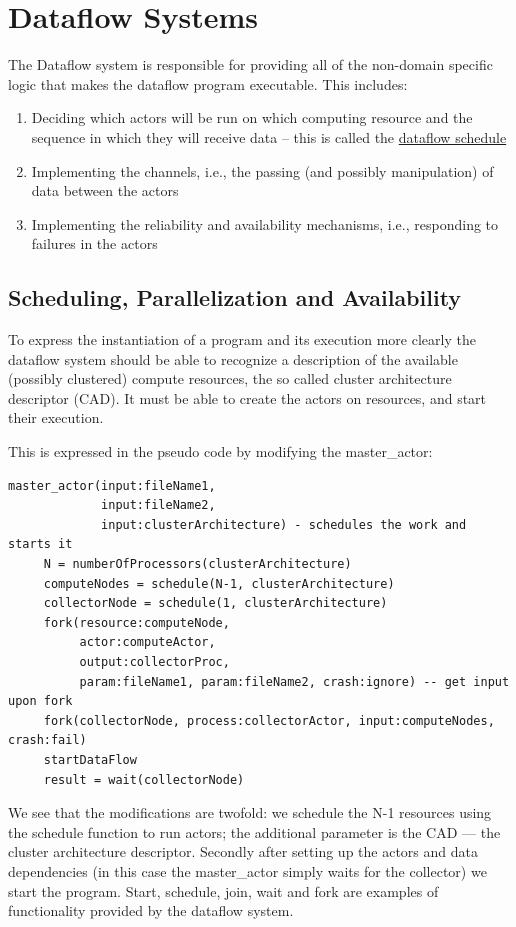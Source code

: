 \documentclass[11pt,a4paper]{article}
\begin{document}
\section{Dataflow Systems}
\label{sec:dataflow-systems}
The Dataflow system is responsible for providing all of the non-domain
specific logic that makes the dataflow program executable. This
includes:
\begin{enumerate}
\item Deciding which actors will be run on which computing resource
  and the sequence in which they will receive data -- this is called
  the \underline{dataflow schedule}
\item Implementing the channels, i.e., the passing (and possibly
  manipulation) of data between the actors
\item Implementing the reliability and availability mechanisms, i.e.,
  responding to failures in the actors 
\end{enumerate}

\subsection{Scheduling, Parallelization and Availability}

To express the instantiation of a program and its execution more
clearly the dataflow system should be able to recognize a description
of the available (possibly clustered) compute resources, the so called
cluster architecture descriptor (CAD).  It must be able to create the
actors on resources, and start their execution.  


\begin{Example}

This is expressed in
the pseudo code by modifying the master\_actor:

\begin{lstlisting}
master_actor(input:fileName1, 
             input:fileName2, 
             input:clusterArchitecture) - schedules the work and starts it
     N = numberOfProcessors(clusterArchitecture)
     computeNodes = schedule(N-1, clusterArchitecture)
     collectorNode = schedule(1, clusterArchitecture)
     fork(resource:computeNode, 
          actor:computeActor, 
          output:collectorProc,
          param:fileName1, param:fileName2, crash:ignore) -- get input upon fork
     fork(collectorNode, process:collectorActor, input:computeNodes, crash:fail)
     startDataFlow
     result = wait(collectorNode)
\end{lstlisting}

We see that the modifications are twofold: we schedule the N-1
resources using the schedule function to run actors; the additional
parameter is the CAD --- the cluster architecture descriptor.
Secondly after setting up the actors and data dependencies (in this
case the master\_actor simply waits for the collector) we start the
program.  Start, schedule, join, wait and fork are examples of
functionality provided by the dataflow system.

\end{Example}
\end{document}
